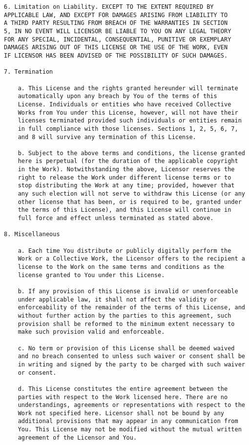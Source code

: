 \begin{verbatim}
6. Limitation on Liability. EXCEPT TO THE EXTENT REQUIRED BY
APPLICABLE LAW, AND EXCEPT FOR DAMAGES ARISING FROM LIABILITY TO
A THIRD PARTY RESULTING FROM BREACH OF THE WARRANTIES IN SECTION
5, IN NO EVENT WILL LICENSOR BE LIABLE TO YOU ON ANY LEGAL THEORY
FOR ANY SPECIAL, INCIDENTAL, CONSEQUENTIAL, PUNITIVE OR EXEMPLARY
DAMAGES ARISING OUT OF THIS LICENSE OR THE USE OF THE WORK, EVEN
IF LICENSOR HAS BEEN ADVISED OF THE POSSIBILITY OF SUCH DAMAGES.

7. Termination

    a. This License and the rights granted hereunder will terminate
    automatically upon any breach by You of the terms of this
    License. Individuals or entities who have received Collective
    Works from You under this License, however, will not have their
    licenses terminated provided such individuals or entities remain
    in full compliance with those licenses. Sections 1, 2, 5, 6, 7,
    and 8 will survive any termination of this License.

    b. Subject to the above terms and conditions, the license granted
    here is perpetual (for the duration of the applicable copyright
    in the Work). Notwithstanding the above, Licensor reserves the
    right to release the Work under different license terms or to
    stop distributing the Work at any time; provided, however that
    any such election will not serve to withdraw this License (or any
    other license that has been, or is required to be, granted under
    the terms of this License), and this License will continue in
    full force and effect unless terminated as stated above.

8. Miscellaneous

    a. Each time You distribute or publicly digitally perform the
    Work or a Collective Work, the Licensor offers to the recipient a
    license to the Work on the same terms and conditions as the
    license granted to You under this License.

    b. If any provision of this License is invalid or unenforceable
    under applicable law, it shall not affect the validity or
    enforceability of the remainder of the terms of this License, and
    without further action by the parties to this agreement, such
    provision shall be reformed to the minimum extent necessary to
    make such provision valid and enforceable.

    c. No term or provision of this License shall be deemed waived
    and no breach consented to unless such waiver or consent shall be
    in writing and signed by the party to be charged with such waiver
    or consent.

    d. This License constitutes the entire agreement between the
    parties with respect to the Work licensed here. There are no
    understandings, agreements or representations with respect to the
    Work not specified here. Licensor shall not be bound by any
    additional provisions that may appear in any communication from
    You. This License may not be modified without the mutual written
    agreement of the Licensor and You.
\end{verbatim}

